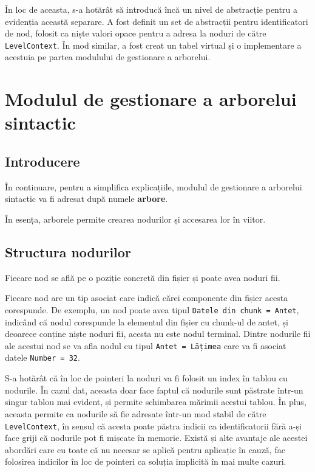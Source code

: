 \documentclass[a4paper,12pt]{report}
\begin{document}
În loc de aceasta, s-a hotărât să introducă încă un nivel de abstracție pentru a evidenția această separare.
A fost definit un set de abstracții pentru identificatori de nod,
folosit ca niște valori opace pentru a adresa la noduri de către \texttt{LevelContext}.
În mod similar, a fost creat un tabel virtual și o implementare a acestuia pe partea modulului de gestionare a arborelui.

\section{Modulul de gestionare a arborelui sintactic}

\subsection{Introducere}

În continuare, pentru a simplifica explicațiile,
modulul de gestionare a arborelui sintactic va fi adresat după numele \textbf{arbore}.

În esența, arborele permite crearea nodurilor și accesarea lor în viitor.

\subsection{Structura nodurilor}

Fiecare nod se află pe o poziție concretă din fișier și poate avea noduri fii.

Fiecare nod are un tip asociat care indică cărei componente din fișier acesta corespunde.
De exemplu, un nod poate avea tipul \texttt{Datele din chunk = Antet},
indicând că nodul corespunde la elementul din fișier cu chunk-ul de antet,
și deoarece conține niște noduri fii, acesta nu este nodul terminal.
Dintre nodurile fii ale acestui nod se va afla nodul cu tipul \texttt{Antet = Lățimea}
care va fi asociat datele \texttt{Number = 32}.

S-a hotărât că în loc de pointeri la noduri va fi folosit un index în tablou cu nodurile.
În cazul dat, aceasta doar face faptul că nodurile sunt păstrate într-un singur tablou mai evident,
și permite schimbarea mărimii acestui tablou.
În plus, aceasta permite ca nodurile să fie adresate într-un mod stabil de către \texttt{LevelContext},
în sensul că acesta poate păstra indicii ca identificatorii fără a-și face griji că nodurile pot fi mișcate în memorie.
Există și alte avantaje ale acestei abordări care cu toate că nu necesar se aplică pentru aplicație în cauză,
fac folosirea indicilor în loc de pointeri ca soluția implicită în mai multe cazuri.
\end{document}
